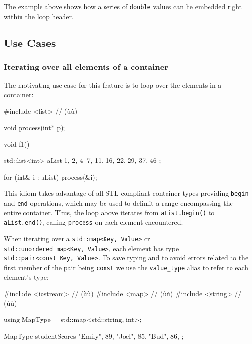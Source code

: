{{\noindent The example above shows how a series of \lstinline!double! values can be
embedded right within the loop header.

\subsection[Use Cases]{Use Cases}\label{use-cases}

\subsubsection[Iterating over all elements of a container]{Iterating over all elements of a container}\label{iterating-over-all-elements-of-a-container}

The motivating use case for this feature is to loop over the elements in
a container:

\begin{emcppslisting}
#include <list>  // (ù{}ù)

void process(int* p);

void f1()
{
    std::list<int> aList{ 1, 2, 4, 7, 11, 16, 22, 29, 37, 46 };

    for (int& i : aList)
    {
        process(&i);
    }
}
\end{emcppslisting}
    

\noindent This idiom takes advantage of all STL-compliant container types
providing \lstinline!begin! and \lstinline!end! operations, which may be used
to delimit a range encompassing the entire container. Thus, the loop
above iterates from \lstinline!aList.begin()! to \lstinline!aList.end()!,
calling \lstinline!process! on each element encountered.

When iterating over a \lstinline!std::map<Key,!~\lstinline!Value>! or
\lstinline!std::unordered_map<Key,!~\lstinline!Value>!, each element has type
\lstinline!std::pair<const!~\lstinline!Key,!~\lstinline!Value>!. To save typing
and to avoid errors related to the first member of the pair being
\lstinline!const! we use the \lstinline!value_type! alias to refer to each
element's type:

\begin{emcppslisting}
#include <iostream>  // (ù{}ù)
#include <map>       // (ù{}ù)
#include <string>    // (ù{}ù)

using MapType = std::map<std::string, int>;

MapType studentScores
{
    {"Emily", 89},
    {"Joel",  85},
    {"Bud",   86},
};


\end{emcppslisting}}}
